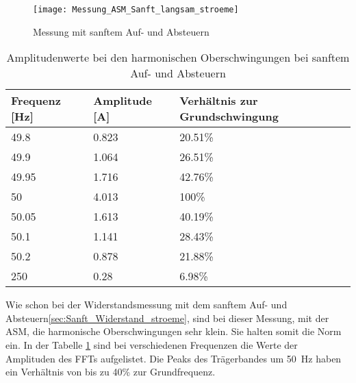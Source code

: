 \begin{figure}[ht!]
	\centering
	\texttt{[image: Messung\_ASM\_Sanft\_langsam\_stroeme]}	
	\caption{Messung mit sanftem Auf- und Absteuern}\label{fig:Mess_Sanft_langsam_stroeme}
\end{figure}


\begin{table}[ht!]
	\centering
	\begin{tabular}{|l|l|l|}
		\hline
		Frequenz {[}Hz{]} & Amplitude {[}A{]} & Verhältnis zur Grundschwingung	\\ \hline
		49.8              & 0.823             & 20.51\%							\\ \hline
		49.9              & 1.064             & 26.51\%							\\ \hline
		49.95             & 1.716             & 42.76\%							\\ \hline
		50                & 4.013             & 100\%							\\ \hline
		50.05             & 1.613             & 40.19\%							\\ \hline
		50.1              & 1.141             & 28.43\%							\\ \hline
		50.2              & 0.878             & 21.88\%							\\ \hline
		250               & 0.28              & 6.98\%							\\ \hline
	\end{tabular}
	\caption{Amplitudenwerte bei den harmonischen Oberschwingungen bei sanftem Auf- und Absteuern}\label{tab:Sanft_langsam_ASM_stroeme}
\end{table}

Wie schon bei der Widerstandsmessung mit dem sanftem Auf- und Absteuern\ref{sec:Sanft_Widerstand_stroeme}, sind bei dieser Messung, mit der ASM, die harmonische Oberschwingungen sehr klein. Sie halten somit die Norm ein. In der Tabelle \ref{tab:Sanft_langsam_ASM_stroeme} sind bei verschiedenen Frequenzen die Werte der Amplituden des FFTs aufgelistet.
Die Peaks des Trägerbandes um \SI{50}{Hz} haben ein Verhältnis von bis zu 40\% zur Grundfrequenz.

\newpage
